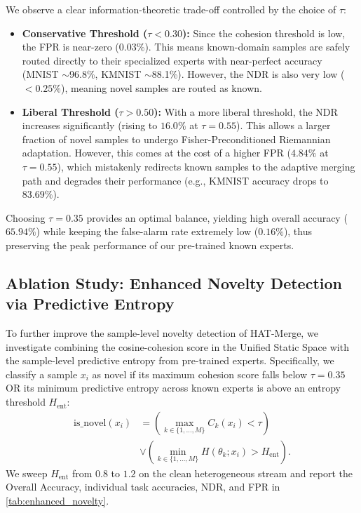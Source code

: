 \documentclass{article}
\theoremstyle{plain}
\theoremstyle{definition}
\theoremstyle{remark}
\begin{document}
We observe a clear information-theoretic trade-off controlled by the choice of $\tau$:
\begin{itemize}
    \item \textbf{Conservative Threshold ($\tau < 0.30$):} Since the cohesion threshold is low, the FPR is near-zero ($0.03\%$). This means known-domain samples are safely routed directly to their specialized experts with near-perfect accuracy (MNIST $\sim$96.8\%, KMNIST $\sim$88.1\%). However, the NDR is also very low ($<0.25\%$), meaning novel samples are routed as known.
    \item \textbf{Liberal Threshold ($\tau > 0.50$):} With a more liberal threshold, the NDR increases significantly (rising to $16.0\%$ at $\tau = 0.55$). This allows a larger fraction of novel samples to undergo Fisher-Preconditioned Riemannian adaptation. However, this comes at the cost of a higher FPR ($4.84\%$ at $\tau = 0.55$), which mistakenly redirects known samples to the adaptive merging path and degrades their performance (e.g., KMNIST accuracy drops to $83.69\%$).
\end{itemize}
Choosing $\tau = 0.35$ provides an optimal balance, yielding high overall accuracy ($65.94\%$) while keeping the false-alarm rate extremely low ($0.16\%$), thus preserving the peak performance of our pre-trained known experts.

\subsection{Ablation Study: Enhanced Novelty Detection via Predictive Entropy}
\label{submission_ablation_entropy}
To further improve the sample-level novelty detection of HAT-Merge, we investigate combining the cosine-cohesion score in the Unified Static Space with the sample-level predictive entropy from pre-trained experts. Specifically, we classify a sample $x_i$ as novel if its maximum cohesion score falls below $\tau = 0.35$ OR its minimum predictive entropy across known experts is above an entropy threshold $H_{\text{ent}}$:
\begin{align}
    \text{is\_novel}(x_i) &= \left( \max_{k \in \{1, \dots, M\}} C_k(x_i) < \tau \right) \nonumber \\
    &\lor \left( \min_{k \in \{1, \dots, M\}} H(\theta_k; x_i) > H_{\text{ent}} \right).
\end{align}
We sweep $H_{\text{ent}}$ from $0.8$ to $1.2$ on the clean heterogeneous stream and report the Overall Accuracy, individual task accuracies, NDR, and FPR in \cref{tab:enhanced_novelty}.
\end{document}
